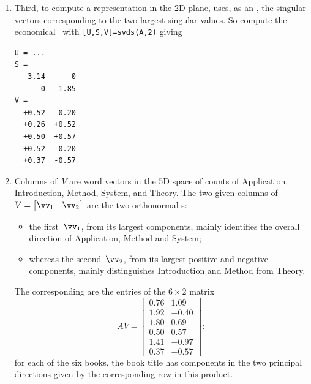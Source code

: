 \begin{reduce}
\begin{enumerate}
\item Third, to compute a representation in the 2D plane,  uses, as an , the singular vectors corresponding to the two largest singular values.  
So compute the economical \svd\ with \verb|[U,S,V]=svds(A,2)| giving \twodp
\begin{verbatim}
U = ...
S =
   3.14      0
      0   1.85
V =
  +0.52  -0.20
  +0.26  +0.52
  +0.50  +0.57
  +0.52  -0.20
  +0.37  -0.57
\end{verbatim}

\item Columns of~\(V\) are word vectors in the 5D space of counts of Application, Introduction, Method, System, and Theory.
The two given columns of \(V=\begin{bmatrix} \vv_1&\vv_2 \end{bmatrix}\) are the two orthonormal s:
\begin{itemize}
\item the first~\(\vv_1\), from its largest components, mainly identifies the overall direction of Application, Method and System;
\item whereas the second~\(\vv_2\), from its largest positive and negative components, mainly distinguishes Introduction and Method from Theory.
\end{itemize}
The corresponding  are the entries of the \(6\times 2\) matrix
\begin{equation*}
AV=\begin{bmatrix} 0.76 & 1.09 \\
1.92 & -0.40 \\
1.80 & 0.69 \\
0.50 & 0.57 \\
1.41 & -0.97 \\
0.37 & -0.57 \end{bmatrix}:
\end{equation*}
for each of the six books, the book title has components in the two principal directions given by the corresponding row in this product.
\end{enumerate}
\end{reduce}

